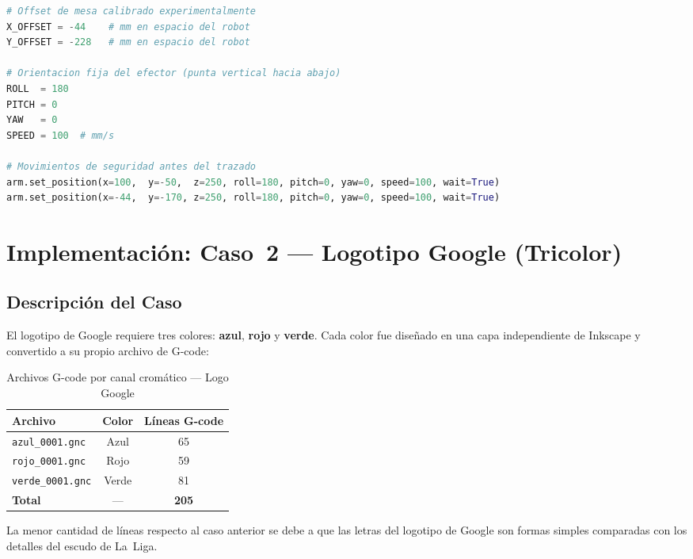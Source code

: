 \documentclass[journal,compsoc]{IEEEtran}
\begin{document}
\begin{lstlisting}[language=Python, caption=Parámetros de posición y ejecución del caso monocolor.]
# Offset de mesa calibrado experimentalmente
X_OFFSET = -44    # mm en espacio del robot
Y_OFFSET = -228   # mm en espacio del robot

# Orientacion fija del efector (punta vertical hacia abajo)
ROLL  = 180
PITCH = 0
YAW   = 0
SPEED = 100  # mm/s

# Movimientos de seguridad antes del trazado
arm.set_position(x=100,  y=-50,  z=250, roll=180, pitch=0, yaw=0, speed=100, wait=True)
arm.set_position(x=-44,  y=-170, z=250, roll=180, pitch=0, yaw=0, speed=100, wait=True)
\end{lstlisting}

\section{Implementación: Caso~2 --- Logotipo Google (Tricolor)}

\subsection{Descripción del Caso}

El logotipo de Google requiere tres colores: \textbf{azul}, \textbf{rojo} y \textbf{verde}. Cada color fue diseñado en una capa independiente de Inkscape y convertido a su propio archivo de G-code:

\begin{table}[h]
\renewcommand{\arraystretch}{1.3}
\caption{Archivos G-code por canal cromático --- Logo Google}
\label{tab:files}
\centering
\begin{tabular}{lcc}
\toprule
\textbf{Archivo} & \textbf{Color} & \textbf{Líneas G-code} \\
\midrule
\texttt{azul\_0001.gnc}  & Azul  & 65 \\
\texttt{rojo\_0001.gnc}  & Rojo  & 59 \\
\texttt{verde\_0001.gnc} & Verde & 81 \\
\midrule
\textbf{Total} & --- & \textbf{205} \\
\bottomrule
\end{tabular}
\end{table}

La menor cantidad de líneas respecto al caso anterior se debe a que las letras del logotipo de Google son formas simples comparadas con los detalles del escudo de La~Liga.
\end{document}
